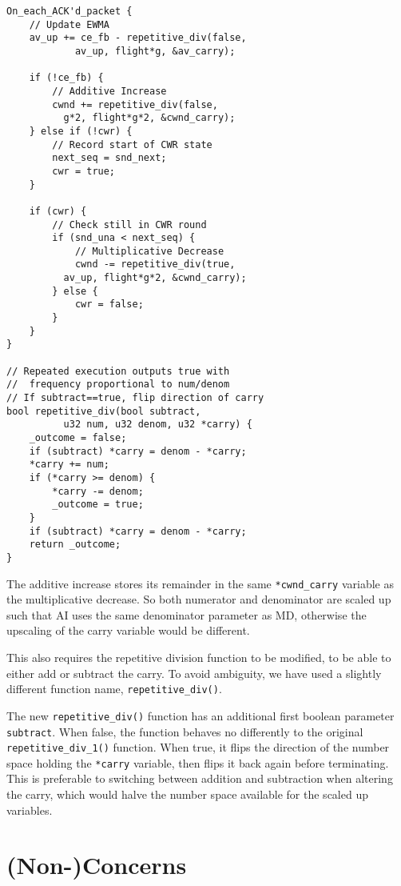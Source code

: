 \begin{verbatim}
On_each_ACK'd_packet {
    // Update EWMA
    av_up += ce_fb - repetitive_div(false,
            av_up, flight*g, &av_carry);

    if (!ce_fb) {
        // Additive Increase
        cwnd += repetitive_div(false,
          g*2, flight*g*2, &cwnd_carry);
    } else if (!cwr) {
        // Record start of CWR state
        next_seq = snd_next;
        cwr = true;
    }

    if (cwr) {
        // Check still in CWR round
        if (snd_una < next_seq) {
            // Multiplicative Decrease
            cwnd -= repetitive_div(true,
          av_up, flight*g*2, &cwnd_carry);
        } else {
            cwr = false;
        }
    }
}

// Repeated execution outputs true with
//  frequency proportional to num/denom
// If subtract==true, flip direction of carry
bool repetitive_div(bool subtract,
          u32 num, u32 denom, u32 *carry) {
    _outcome = false;
    if (subtract) *carry = denom - *carry;
    *carry += num;
    if (*carry >= denom) {
        *carry -= denom;
        _outcome = true;
    }
    if (subtract) *carry = denom - *carry;
    return _outcome;
}
\end{verbatim}

The additive increase stores its remainder in the same \texttt{*cwnd\_carry} variable as the multiplicative decrease. So both numerator and denominator are scaled up such that AI uses the same denominator parameter as MD, otherwise the upscaling of the carry variable would be different.

This also requires the repetitive division function to be modified, to be able to either add or subtract the carry. To avoid ambiguity, we have used a slightly different function name, \texttt{repetitive\_div()}.

The new \texttt{repetitive\_div()} function has an additional first boolean parameter \texttt{subtract}. When false, the function behaves no differently to the original \texttt{repetitive\_div\_1()} function. When true, it flips the direction of the number space holding the \texttt{*carry} variable, then flips it back again before terminating. This is preferable to switching between addition and subtraction when altering the carry, which would halve the number space available for the scaled up variables.

\section{(Non-)Concerns}\label{prresp_Non-Concerns}

